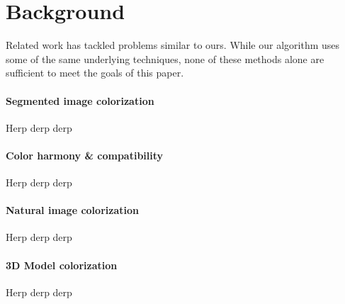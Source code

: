 \section{Background}
\label{sec:background}


Related work has tackled problems similar to ours. While our algorithm uses some of the same underlying techniques, none of these methods alone are sufficient to meet the goals of this paper.

\paragraph{Segmented image colorization}
Herp derp derp

\paragraph{Color harmony \& compatibility}
Herp derp derp

\paragraph{Natural image colorization}
Herp derp derp

\paragraph{3D Model colorization}
Herp derp derp


